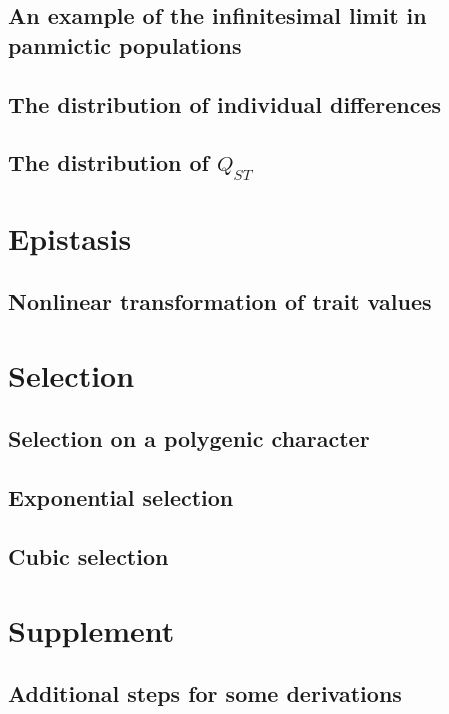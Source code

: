 \documentclass{article}
\begin{document}
\subsection{An example of the infinitesimal limit in panmictic populations}

\subsection{The distribution of individual differences}

\subsection{The distribution of $Q_{ST}$}

\section{Epistasis}
\subsection{Nonlinear transformation of trait values}

\section{Selection}
\subsection{Selection on a polygenic character}

\subsection{Exponential selection}

\subsection{Cubic selection}


\clearpage



\section{Supplement}
\subsection{Additional steps for some derivations}

\end{document}
